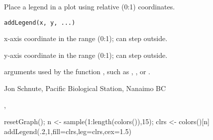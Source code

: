 \documentclass[letterpaper]{book}
\begin{document}
\begin{Description}\relax
Place a legend in a plot using relative (0:1) coordinates.
\end{Description}
\begin{Usage}
\begin{verbatim}
addLegend(x, y, ...) 
\end{verbatim}
\end{Usage}
\begin{Arguments}
\begin{ldescription}
\item[\code{x}] x-axis coordinate in the range (0:1); can step outside.
\item[\code{y}] y-axis coordinate in the range (0:1); can step outside.
\item[\code{...}] arguments used by the function , 
such as , , or .
\end{ldescription}
\end{Arguments}
\begin{Author}\relax
Jon Schnute, Pacific Biological Station, Nanaimo BC
\end{Author}
\begin{SeeAlso}\relax
{}, 
\end{SeeAlso}
\begin{Examples}
\begin{ExampleCode}
resetGraph(); n <- sample(1:length(colors()),15); clrs <- colors()[n]
addLegend(.2,1,fill=clrs,leg=clrs,cex=1.5)
\end{ExampleCode}
\end{Examples}
\end{document}
